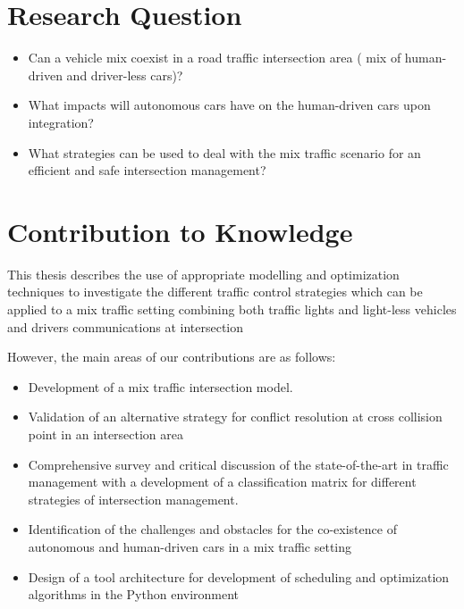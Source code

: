 \documentclass{book}
\begin{document}
\section{Research Question}
\label{sec:question}
\begin{itemize}
\item Can a vehicle  mix coexist in a road traffic intersection area ( mix of human-driven and driver-less cars)?
\item What impacts will autonomous cars have on the human-driven cars upon integration?
\item What strategies can be used to deal with the mix traffic scenario for an efficient and safe intersection management?
\end{itemize}

\section{Contribution to Knowledge}
\label{sec:contribuion}
This thesis describes the use of appropriate modelling and optimization techniques to investigate the different traffic control strategies which can be applied to a mix traffic setting combining both traffic lights and light-less vehicles and drivers communications at intersection

However, the main areas of our contributions are as follows:
 \begin{itemize}
 \item Development of a mix traffic intersection model.
 \item Validation of an alternative strategy for conflict resolution at cross collision point in an intersection area
 \item Comprehensive survey and critical discussion of the state-of-the-art in traffic management with a development of a classification matrix for different strategies of intersection management.
 \item Identification of the challenges and obstacles for the co-existence of autonomous and human-driven cars in a mix traffic setting
\item Design of a tool architecture for development of scheduling and optimization algorithms in the Python environment
\end{itemize}
\end{document}
